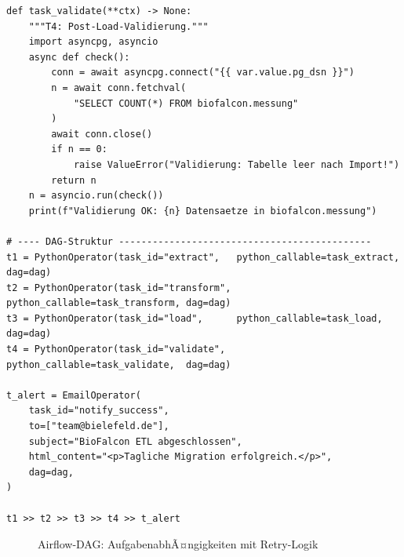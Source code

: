 ﻿\documentclass[12pt,a4paper]{report}
\theoremstyle{definition}
\theoremstyle{remark}
\begin{document}
\begin{lstlisting}[style=python, caption={airflow\_dag.py: ETL-Pipeline als Airflow-DAG}, label=lst:airflow]
def task_validate(**ctx) -> None:
    """T4: Post-Load-Validierung."""
    import asyncpg, asyncio
    async def check():
        conn = await asyncpg.connect("{{ var.value.pg_dsn }}")
        n = await conn.fetchval(
            "SELECT COUNT(*) FROM biofalcon.messung"
        )
        await conn.close()
        if n == 0:
            raise ValueError("Validierung: Tabelle leer nach Import!")
        return n
    n = asyncio.run(check())
    print(f"Validierung OK: {n} Datensaetze in biofalcon.messung")

# ---- DAG-Struktur ---------------------------------------------
t1 = PythonOperator(task_id="extract",   python_callable=task_extract,  dag=dag)
t2 = PythonOperator(task_id="transform", python_callable=task_transform, dag=dag)
t3 = PythonOperator(task_id="load",      python_callable=task_load,      dag=dag)
t4 = PythonOperator(task_id="validate",  python_callable=task_validate,  dag=dag)

t_alert = EmailOperator(
    task_id="notify_success",
    to=["team@bielefeld.de"],
    subject="BioFalcon ETL abgeschlossen",
    html_content="<p>Tagliche Migration erfolgreich.</p>",
    dag=dag,
)

t1 >> t2 >> t3 >> t4 >> t_alert
\end{lstlisting}

\begin{figure}[H]
\centering
{}
\caption{Airflow-DAG: AufgabenabhÃ¤ngigkeiten mit Retry-Logik}
\label{fig:dag}
\end{figure}
\end{document}
